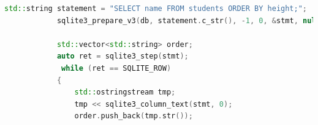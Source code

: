 \documentclass [11pt,a4paper,dvipdfmx] {jarticle}
\begin{document}
\begin{lstlisting}[language=C++]
            std::string statement = "SELECT name FROM students ORDER BY height;";
            sqlite3_prepare_v3(db, statement.c_str(), -1, 0, &stmt, nullptr);                                                                                                                                                                                                           
                                                                                                                                                                                                                                                                                      
            std::vector<std::string> order;                                                                                                                                                                                                                                             
            auto ret = sqlite3_step(stmt);                                                                                                                                                                                                                                              
             while (ret == SQLITE_ROW)                                                                                                                                                                                                                                                   
            {                                                                                                                                                                                                                                                                           
                std::ostringstream tmp;                                                                                                                                                                                                                                                   
                tmp << sqlite3_column_text(stmt, 0);                                                                                                                                                                                                                                      
                order.push_back(tmp.str());                                                                                                                                                                                                                                               

\end{lstlisting}
\end{document}
